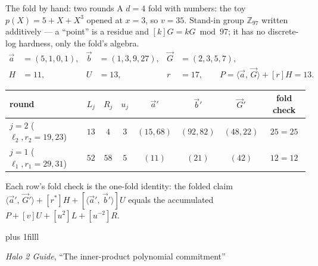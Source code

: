 \documentclass[aspectratio=169,11pt]{beamer}
\newcommand{\ip}[2]{\langle #1,\, #2 \rangle}
\newcommand{\src}[1]{\par\vskip0pt plus 1filll
  {\fontsize{6}{7.2}\selectfont\color{arbdim}\raggedright #1\par}}
\begin{document}
\begin{frame}{The fold by hand: two rounds}
A $d = 4$ fold with numbers: the toy
$p(X) = 5 + X + X^3$ opened at $x = 3$, so $v = 35$. Stand-in group
$\mathbb{Z}_{97}$ written additively --- a ``point'' is a residue and $[k]G = kG
\bmod 97$; it has no discrete-log hardness, only the fold's algebra.
\begin{align*}
\vec a &= (5, 1, 0, 1), &
\vec b &= (1, 3, 9, 27), &
\vec G &= (2, 3, 5, 7), \\
H &= 11, & U &= 13, & r &= 17,
\qquad P = \ip{\vec a}{\vec G} + [r]H = 13 .
\end{align*}
\begin{center}\small
\begin{tabular}{@{}l ccc ccc c@{}}
\toprule
round & $L_j$ & $R_j$ & $u_j$ & $\vec a'$ & $\vec b'$ & $\vec G'$
  & fold check \\
\midrule
$j = 2$ ($\ell_2, r_2 = 19, 23$) & $13$ & $4$ & $3$ & $(15, 68)$ & $(92, 82)$
  & $(48, 22)$ & $25 = 25$ \\
$j = 1$ ($\ell_1, r_1 = 29, 31$) & $52$ & $58$ & $5$ & $(11)$ & $(21)$
  & $(42)$ & $12 = 12$ \\
\bottomrule
\end{tabular}
\end{center}
Each row's fold check is the one-fold identity: the folded
claim $\ip{\vec a'}{\vec G'} + [r^{*}]H + [\ip{\vec a'}{\vec b'}]U$ equals
the accumulated $P + [v]U + [u^2]L + [u^{-2}]R$.
\src{\emph{Halo 2 Guide}, ``The inner-product polynomial commitment''}
\end{frame}
\end{document}
